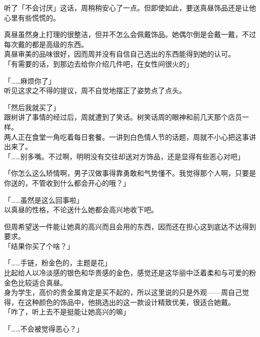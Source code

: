 听了「不会讨厌」这话，周稍稍安心了一点。但即使如此，要送真昼饰品还是让他心里有些慌慌的。

真昼虽然身上打理的很整洁，但并不怎么会佩戴饰品。她偶尔倒是会戴一戴，不过每次戴的都是高级的东西。\\

真昼审美的品味很好，因而周并没有自信自己选出的东西能得到她的认可。\\

「有需要的话，到那边去给你介绍几件吧，在女性间很火的」

「……麻烦你了」\\

听见这求之不得的提议，周不自觉地摆正了姿势点了点头。\\

\vspace{2\baselineskip}

「然后我就买了」\\

跟树讲了事情的经过后，周就遭到了笑话。树笑话周的眼神和前几天那个店员一样。\\

两人正在食堂一角吃着每日套餐。一讲到白色情人节的话题，周就不小心把这事讲出来了。\\

「……别多嘴。不过啊，明明没有交往却送对方饰品，还是显得有些恶心对吧」

「你怎么这么矫情啊，男子汉做事得靠勇敢和气势懂不。我觉得那个人啊，只要是你送的，不管收到什么都会开心的哦？」

「……虽然是这么回事啦」\\

以真昼的性格，不论送什么她都会高兴地收下吧。

但周希望送一件能让她真的高兴而且会用的东西，因而还在担心这到底达不达得到要求。\\

「结果你买了个啥？」

「……手链，粉金色的，主题是花」\\

比起给人以冷淡感的银色和华贵感的金色，感觉还是这华丽中泛着柔和与可爱的粉金色比较适合真昼。\\

身为学生，高价的贵金属肯定是买不起的，所以这里说的只是外观——周自己觉得，在这种颜色的饰品中，他挑选出的这一款设计精致优美，很适合她戴。\\

「咋了，听上去不是挺能让她高兴的嘛」

「……不会被觉得恶心？」

